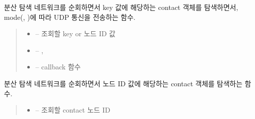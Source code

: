 \documentclass[a4paper,10pt,english]{sphinxmanual}
\begin{document}
\begin{fulllineitems}
\begin{fulllineitems}
\label{\detokenize{_kademlia:KNode._iterativeFind}}
\pysigstartsignatures
{}
\pysigstopsignatures
\sphinxAtStartPar
분산 탐색 네트워크를 순회하면서 key 값에 해당하는 contact 객체를 탐색하면서, mode(, )에 따라
UDP 통신을 전송하는 함수.
\begin{quote}\begin{description}
\begin{itemize}
\item {} 
\sphinxAtStartPar
{} – 조회할 key or 노드 ID 값

\item {} 
\sphinxAtStartPar
{} – , 

\item {} 
\sphinxAtStartPar
{} – callback 함수

\end{itemize}

\end{description}\end{quote}

\end{fulllineitems}


\begin{fulllineitems}
\label{\detokenize{_kademlia:KNode._iterativeFindNode}}
\pysigstartsignatures
{}
\pysigstopsignatures
\sphinxAtStartPar
분산 탐색 네트워크를 순회하면서 노드 ID 값에 해당하는 contact 객체를 탐색하는 함수.
\begin{quote}\begin{description}
\begin{itemize}
\item {} 
\sphinxAtStartPar
{} – 조회할 contact 노드 ID


\end{itemize}
\end{description}
\end{quote}
\end{fulllineitems}
\end{fulllineitems}
\end{document}
